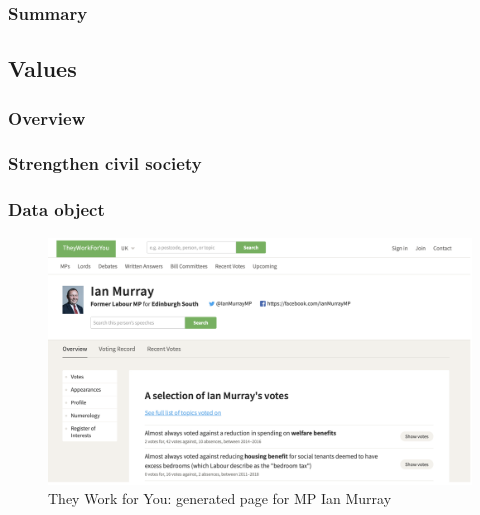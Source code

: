 \documentclass{article}
\begin{document}
        	\subsubsection*{Summary}
        	
        	        	          	  
        \subsection*{Values}

        	\subsubsection*{Overview}
        	

        	\subsubsection*{Strengthen civil society}
        	

        	\subsubsection*{Data object}
        	

			\begin{figure}
				\centering
				\includegraphics[scale=0.5]{images/they-work-for-you-ian-murray}
				\caption{They Work for You: generated page for MP Ian Murray}
				\label{fig:they-work-for-you-ian-murray}
			\end{figure}
			
\end{document}
